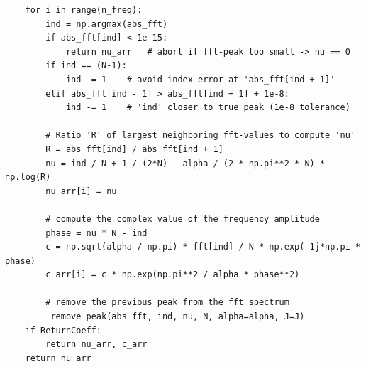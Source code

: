 \documentclass[english, parskip=full]{scrartcl}
\begin{document}
\begin{verbatim}
    for i in range(n_freq):
        ind = np.argmax(abs_fft)
        if abs_fft[ind] < 1e-15:   
            return nu_arr   # abort if fft-peak too small -> nu == 0
        if ind == (N-1):   
            ind -= 1    # avoid index error at 'abs_fft[ind + 1]'
        elif abs_fft[ind - 1] > abs_fft[ind + 1] + 1e-8:   
            ind -= 1    # 'ind' closer to true peak (1e-8 tolerance)
            
        # Ratio 'R' of largest neighboring fft-values to compute 'nu'
        R = abs_fft[ind] / abs_fft[ind + 1]
        nu = ind / N + 1 / (2*N) - alpha / (2 * np.pi**2 * N) * np.log(R)
        nu_arr[i] = nu
        
        # compute the complex value of the frequency amplitude
        phase = nu * N - ind
        c = np.sqrt(alpha / np.pi) * fft[ind] / N * np.exp(-1j*np.pi * phase)
        c_arr[i] = c * np.exp(np.pi**2 / alpha * phase**2)
        
        # remove the previous peak from the fft spectrum
        _remove_peak(abs_fft, ind, nu, N, alpha=alpha, J=J)
    if ReturnCoeff:
        return nu_arr, c_arr
    return nu_arr
\end{verbatim}
\end{document}
